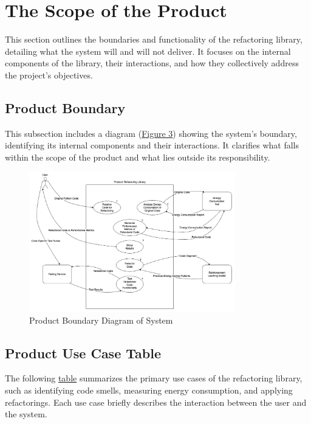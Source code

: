\documentclass[12pt]{article}
\begin{document}
\section{The Scope of the Product}
This section outlines the boundaries and functionality of the refactoring library, detailing what the system will and will not deliver. It focuses on the internal components of the library, their interactions, and how they collectively address the project's objectives.

\subsection{Product Boundary}
This subsection includes a diagram (\hyperref[img:prod-bound]{Figure 3}) showing the system's boundary, identifying its internal components and their interactions. It clarifies what falls within the scope of the product and what lies outside its responsibility.

\begin{figure}[H]
  \centering
  \includegraphics[width=0.8\textwidth]{../Images/UseCaseDiagram.png}
  \caption{Product Boundary Diagram of System}
  \label{img:prod-bound}
\end{figure}

\subsection{Product Use Case Table}
The following \hyperref[tab:puc]{table} summarizes the primary use cases of the refactoring library, such as identifying code smells, measuring energy consumption, and applying refactorings. Each use case briefly describes the interaction between the user and the system.

\setlength\extrarowheight{2mm}
\end{document}
